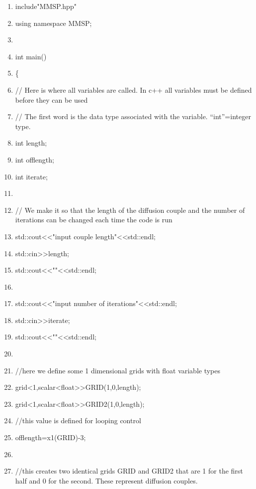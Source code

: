 \documentclass[10pt]{article}
\begin{document}
\begin{shadebox}

\begin{enumerate}  \itemsep1pt \parskip0pt 
\item include"MMSP.hpp"
\item using namespace MMSP;
\item  
\item int main()
\item \{
\item // Here is where all variables are called.  In c++ all variables must be defined before they can be used
\item // The first word is the data type associated with the variable. “int”=integer type.
\item int length;
\item int offlength;
\item int iterate;
\item 
\item // We make it so that the length of the diffusion couple and the number of iterations can be changed each time the code is run
\item std::cout\textless \textless "input couple length"\textless \textless std::endl;
\item std::cin\textgreater \textgreater length;
\item std::cout\textless \textless ""\textless \textless std::endl;
\item 
\item std::cout\textless \textless "input number of iterations"\textless \textless std::endl;
\item std::cin\textgreater \textgreater iterate;
\item std::cout\textless \textless ""\textless \textless std::endl;
\item 
\item //here we define some 1 dimensional grids with float variable types
\item grid\textless 1,scalar\textless float\textgreater  \textgreater  GRID(1,0,length);
\item grid\textless 1,scalar\textless float\textgreater  \textgreater  GRID2(1,0,length);
\item //this value is defined for looping control
\item offlength=x1(GRID)-3;
\item 
\item //this creates two identical grids GRID and GRID2 that are 1 for the first half and 0 for the second.  These represent diffusion couples.

\end{enumerate}
\end{shadebox}
\end{document}
